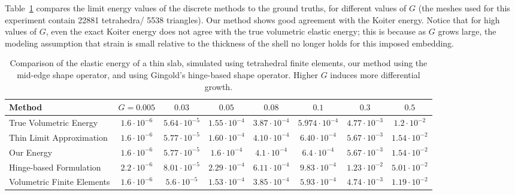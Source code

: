 \documentclass[timestamp,acmtog]{acmart}
\begin{document}
Table~\ref{tab:energy} compares the limit energy values of the discrete methods to the ground truths, for different values of $G$ (the meshes used for this experiment contain 22881 tetrahedra/ 5538 triangles).  Our method shows good agreement with the Koiter energy. Notice that for high values of $G$, even the exact Koiter energy does not agree with the true volumetric elastic energy; this is because as $G$ grows large, the modeling assumption that strain is small relative to the thickness of the shell no longer holds for this imposed embedding.
\begin{table}
\begin{tabular}{l|ccccccc}
Method & $G=0.005$ & $0.03$ & $0.05$ & $0.08$ & $0.1$ & $0.3$ & $0.5$  \\
\hline
True Volumetric Energy & $1.6\cdot 10^{-6}$ & $5.64 \cdot 10^{-5}$ & $1.55 \cdot 10^{-4}$ & $3.87 \cdot 10^{-4}$ & $5.974 \cdot 10^{-4}$ & $4.77 \cdot 10^{-3}$ & $1.2 \cdot 10^{-2}$ \\
Thin Limit Approximation & $1.6\cdot 10^{-6}$ & $5.77\cdot 10^{-5}$  &  $1.60\cdot10^{-4}$ & $4.10\cdot 10^{-4}$ & $6.40 \cdot 10^{-4}$ & $5.67 \cdot 10^{-3}$ & $1.54\cdot 10^{-2}$\\
\hline
Our Energy & $1.6 \cdot 10^{-6}$ & $5.77 \cdot 10^{-5}$ & $1.6 \cdot 10^{-4}$ & $4.1 \cdot 10^{-4}$ & $6.4 \cdot 10^{-4}$ & $5.67 \cdot 10^{-3}$ & $1.54 \cdot 10^{-2}$ \\
Hinge-based Formulation & $2.2 \cdot 10^{-6}$ & $8.01 \cdot 10^{-5}$ & $2.29 \cdot 10^{-4}$ & $6.11 \cdot 10^{-4}$ & $9.83 \cdot 10^{-4}$ & $1.23 \cdot 10^{-2}$ & $5.01 \cdot 10^{-2}$ \\
Volumetric Finite Elements & $1.6 \cdot 10^{-6}$ & $5.6 \cdot 10^{-5}$ & $1.53 \cdot 10^{-4}$ & $3.85 \cdot 10^{-4}$ & $5.93 \cdot 10^{-4}$ & $4.74 \cdot 10^{-3}$ & $1.19 \cdot 10^{-2}$
\end{tabular}
\caption{Comparison of the elastic energy of a thin slab, simulated using tetrahedral finite elements, our method using the mid-edge shape operator, and using Gingold's hinge-based shape operator. Higher $G$ induces more differential growth.}
\label{tab:energy}
\end{table}
\end{document}
